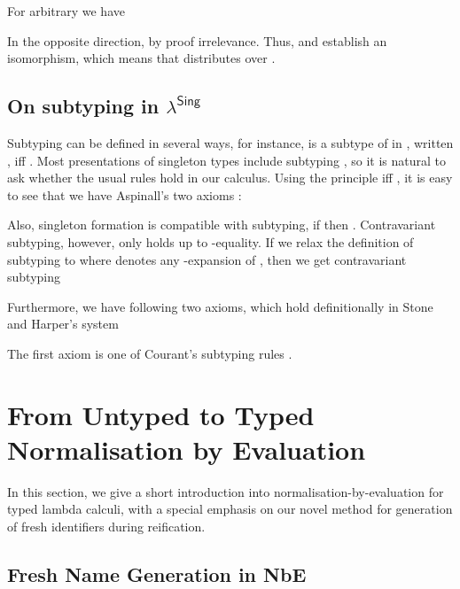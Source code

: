 \documentclass{LMCS}
\newcommand{\lambdaSing}{\texorpdfstring{\ensuremath{\lambda^{\mathsf{Sing}}}}{Singletons}}
\begin{document}
For arbitrary  we have

In the opposite direction,  by proof irrelevance.  Thus,  and  establish an
isomorphism, which means that  distributes over .


\subsection{On subtyping in \lambdaSing}

Subtyping can be defined in several ways, for instance,  is a
subtype of  in , written ,
iff .
Most presentations of singleton types include
subtyping \cite{aspinall:csl94,courant:itrs02,stoneHarper:tocl06}, so
it is natural to ask whether the usual rules hold in our calculus.
Using the principle  iff , it is easy to
see that we have Aspinall's two axioms \cite{aspinall:csl94}:

Also, singleton formation is compatible with subtyping, if  then .  Contravariant subtyping, however, only holds up to
-equality.  If we relax the definition of subtyping  to  where
 denotes any -expansion of , then we get
contravariant subtyping

Furthermore, we have following two axioms, which hold definitionally in Stone and
Harper's system \cite{stoneHarper:tocl06}

The first axiom is one of Courant's subtyping rules \cite{courant:itrs02}. 




 

\section{From Untyped to Typed Normalisation by Evaluation}
\label{sec:nbe-primer}

\noindent In this section, we give a short introduction into
normalisation-by-evaluation for typed lambda calculi, with a special
emphasis on our novel method for generation of fresh identifiers during
reification.

\subsection{Fresh Name Generation in NbE}
\end{document}
